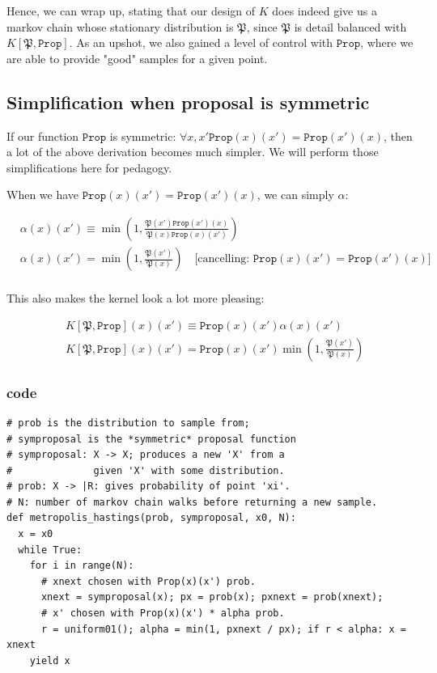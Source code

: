 \documentclass[titlepage]{article}
\renewcommand{\P}{\mathfrak{P}}
\newcommand{\Prop}{\texttt{Prop}}
\begin{document}
Hence, we can wrap up, stating that our design of $K$ does indeed give us a
markov chain whose stationary distribution is $\P$, since $\P$ is detail
balanced with $K[\P, \Prop]$. As an upshot, we also gained a level of control
with $\Prop$, where we are able to provide "good" samples for a given point.

\subsection{Simplification when proposal is symmetric}
If our function $\Prop$ is symmetric: $\forall x, x' \Prop(x)(x') = \Prop(x')(x)$,
then a lot of the above derivation becomes much simpler. We will perform those
simplifications here for pedagogy.


When we have $\Prop(x)(x') = \Prop(x')(x)$, we can simply $\alpha$:

\begin{align*}
&\alpha(x)(x') \equiv   \min\left(1, \frac{\P(x')\Prop(x')(x)}{\P(x)\Prop(x)(x')} \right) \\
&\alpha(x)(x') = \min\left(1, \frac{\P(x')}{\P(x)} \right) \quad \text{[cancelling: $\Prop(x)(x') = \Prop(x')(x)$]}\\ 
\end{align*}

This also makes the kernel look a lot more pleasing:

\begin{align*}
&K[\P, \Prop](x)(x') \equiv \Prop(x)(x') \alpha(x)(x') \\
&K[\P, \Prop](x)(x') = \Prop(x)(x') \min\left(1, \frac{\P(x')}{\P(x)} \right) 
\end{align*}

\newpage
\subsubsection{code}

\begin{verbatim}
# prob is the distribution to sample from;
# symproposal is the *symmetric* proposal function
# symproposal: X -> X; produces a new 'X' from a 
#              given 'X' with some distribution.
# prob: X -> |R: gives probability of point 'xi'.
# N: number of markov chain walks before returning a new sample.
def metropolis_hastings(prob, symproposal, x0, N):
  x = x0
  while True:
    for i in range(N):
      # xnext chosen with Prop(x)(x') prob.
      xnext = symproposal(x); px = prob(x); pxnext = prob(xnext);
      # x' chosen with Prop(x)(x') * alpha prob.
      r = uniform01(); alpha = min(1, pxnext / px); if r < alpha: x = xnext
    yield x
\end{verbatim}
\end{document}
